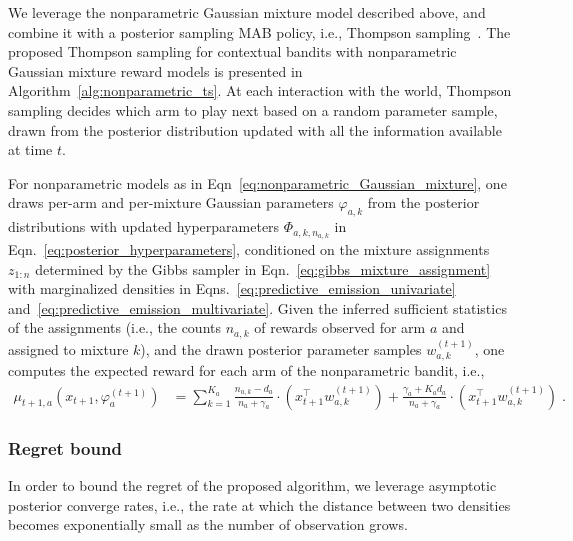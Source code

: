 \documentclass{article}
\newcommand{\ie}{i.e., }
\begin{document}
We leverage the nonparametric Gaussian mixture model described above, and combine it with a posterior sampling MAB policy, \ie Thompson sampling~\cite{j-Russo2018}. The proposed Thompson sampling for contextual bandits with nonparametric Gaussian mixture reward models is presented in Algorithm~\ref{alg:nonparametric_ts}. At each interaction with the world, Thompson sampling decides which arm to play next based on a random parameter sample, drawn from the posterior distribution updated with all the information available at time $t$.

For nonparametric models as in Eqn~\eqref{eq:nonparametric_Gaussian_mixture}, one draws per-arm and per-mixture Gaussian parameters $\varphi_{a,k}$ from the posterior distributions with updated hyperparameters $\varPhi_{a,k,n_{a,k}}$ in Eqn.~\eqref{eq:posterior_hyperparameters}, conditioned on the mixture assignments $z_{1:n}$ determined by the Gibbs sampler in Eqn.~\eqref{eq:gibbs_mixture_assignment} with marginalized densities in Eqns.~\eqref{eq:predictive_emission_univariate} and~\eqref{eq:predictive_emission_multivariate}. Given the inferred sufficient statistics of the assignments (\ie the counts $n_{a,k}$ of rewards observed for arm $a$ and assigned to mixture $k$), and the drawn posterior parameter samples $w_{a,k}^{(t+1)}$, one computes the expected reward for each arm of the nonparametric bandit, \ie
\vspace*{-1ex}
\begin{equation}
\begin{split}
\mu_{t+1,a}(x_{t+1},\varphi_{a}^{(t+1)})&=\sum_{k=1}^{K_a} \frac{n_{a,k}-d_a}{n_a+\gamma_a} \cdot \left(x_{t+1}^\top w_{a,k}^{(t+1)}\right) + \frac{\gamma_a+K_ad_a}{n_a+\gamma_a} \cdot \left(x_{t+1}^\top w_{a,k}^{(t+1)} \right)\; .
\end{split}
\label{eq:nonparametric_expected_reward}
\end{equation}

\subsubsection{Regret bound}
\label{sssec:nonparametric_thompson_sampling_regret_bound}

In order to bound the regret of the proposed algorithm, we leverage asymptotic posterior converge rates, \ie the rate at which the distance between two densities becomes exponentially small as the number of observation grows.
\end{document}

